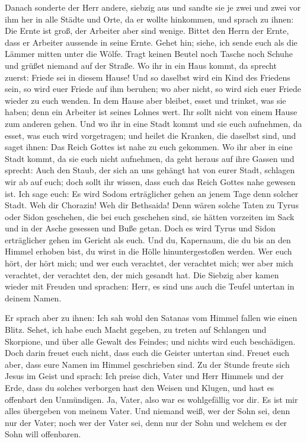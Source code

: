  Danach sonderte der Herr andere, siebzig aus und sandte
sie je zwei und zwei vor ihm her in alle Städte und Orte, da er wollte
hinkommen,  und sprach zu ihnen: Die Ernte ist groß, der
Arbeiter aber sind wenige. Bittet den Herrn der Ernte, dass er Arbeiter
aussende in seine Ernte.  Gehet hin; siehe, ich sende euch
als die Lämmer mitten unter die Wölfe.  Tragt keinen
Beutel noch Tasche noch Schuhe und grüßet niemand auf der Straße.
 Wo ihr in ein Haus kommt, da sprecht zuerst: Friede sei
in diesem Hause!  Und so daselbst wird ein Kind des
Friedens sein, so wird euer Friede auf ihm beruhen; wo aber nicht, so
wird sich euer Friede wieder zu euch wenden.  In dem Hause
aber bleibet, esset und trinket, was sie haben; denn ein Arbeiter ist
seines Lohnes wert. Ihr sollt nicht von einem Hause zum anderen gehen.
 Und wo ihr in eine Stadt kommt und sie euch aufnehmen, da
esset, was euch wird vorgetragen;  und heilet die Kranken,
die daselbst sind, und saget ihnen: Das Reich Gottes ist nahe zu euch
gekommen.  Wo ihr aber in eine Stadt kommt, da sie euch
nicht aufnehmen, da geht heraus auf ihre Gassen und sprecht:
 Auch den Staub, der sich an uns gehängt hat von eurer
Stadt, schlagen wir ab auf euch; doch sollt ihr wissen, dass euch das
Reich Gottes nahe gewesen ist.  Ich sage euch: Es wird
Sodom erträglicher gehen an jenem Tage denn solcher Stadt.
 Weh dir Chorazin! Weh dir Bethsaida! Denn wären solche
Taten zu Tyrus oder Sidon geschehen, die bei euch geschehen sind, sie
hätten vorzeiten im Sack und in der Asche gesessen und Buße getan.
 Doch es wird Tyrus und Sidon erträglicher gehen im
Gericht als euch.  Und du, Kapernaum, die du bis an den
Himmel erhoben bist, du wirst in die Hölle hinuntergestoßen werden.
 Wer euch hört, der hört mich; und wer euch verachtet,
der verachtet mich; wer aber mich verachtet, der verachtet den, der mich
gesandt hat.  Die Siebzig aber kamen wieder mit Freuden
und sprachen: Herr, es sind uns auch die Teufel untertan in deinem
Namen.

 Er sprach aber zu ihnen: Ich sah wohl den Satanas vom
Himmel fallen wie einen Blitz.  Sehet, ich habe euch
Macht gegeben, zu treten auf Schlangen und Skorpione, und über alle
Gewalt des Feindes; und nichts wird euch beschädigen. 
Doch darin freuet euch nicht, dass euch die Geister untertan sind.
Freuet euch aber, dass eure Namen im Himmel geschrieben sind.
 Zu der Stunde freute sich Jesus im Geist und sprach: Ich
preise dich, Vater und Herr Himmels und der Erde, dass du solches
verborgen hast den Weisen und Klugen, und hast es offenbart den
Unmündigen. Ja, Vater, also war es wohlgefällig vor dir. 
Es ist mir alles übergeben von meinem Vater. Und niemand weiß, wer der
Sohn sei, denn nur der Vater; noch wer der Vater sei, denn nur der Sohn
und welchem es der Sohn will offenbaren.

